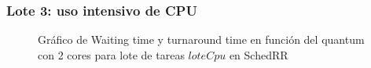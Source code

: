 \subsubsection{Lote 3: uso intensivo de CPU}

\begin{figure}[H]
\hfill
{}
\hfill
{}
\hfill
\caption{Gráfico de Waiting time y turnaround time en función del quantum con 2 cores para lote de tareas $loteCpu$ en SchedRR}
\end{figure}

